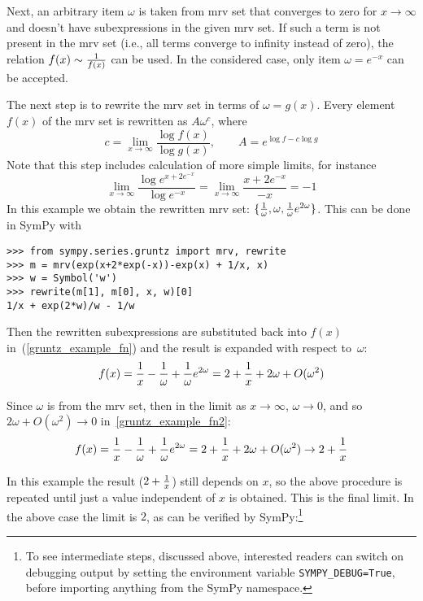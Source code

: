 Next, an arbitrary item $\omega$ is taken from mrv set that converges to zero for
$x\to\infty$ and doesn't have subexpressions in the given mrv set.  If such a term is not
present in the mrv set (i.e., all terms converge to infinity instead of zero),
the relation $f(x)\sim {1\over f(x)}$ can be used.  In the
considered case, only item $\omega=e^{-x}$ can be accepted.

The next step is to rewrite the mrv set in terms of $\omega=g(x)$.  Every element
$f(x)$ of the mrv set is rewritten as $A \omega^c$, where
\begin{equation}
\label{gruntz_rewrite}
c = \lim\limits_{x\to\infty} \frac{\log{f(x)}}{\log{g(x)}},
\qquad
A = e^{\log f - c \log g}
\end{equation}
Note that this step includes calculation of more simple limits, for instance
\begin{equation}
	\lim\limits_{x\to\infty} \frac{\log{e^{x + 2 e^{-x}}}}{\log e^{-x}}=
	\lim\limits_{x\to\infty} \frac{x + 2 e^{-x}}{-x} = -1
\end{equation}
In this example we obtain the rewritten mrv set: $\{{1\over\omega},
\omega, {1\over\omega}e^{2\omega}\}$. This can be done in SymPy with
\begin{verbatim}
>>> from sympy.series.gruntz import mrv, rewrite
>>> m = mrv(exp(x+2*exp(-x))-exp(x) + 1/x, x)
>>> w = Symbol('w')
>>> rewrite(m[1], m[0], x, w)[0]
1/x + exp(2*w)/w - 1/w
\end{verbatim}
Then the rewritten subexpressions are
substituted back into $f(x)$ in~(\ref{gruntz_example_fn})
and the result is expanded with respect to~$\omega$:
\begin{equation}
    \label{gruntz_example_fn2}
f(x) = {1\over x}-{1\over\omega}+{1\over\omega}e^{2\omega}
     = 2+{1\over x} + 2\omega + O(\omega^2)
\end{equation}

Since $\omega$ is from the mrv set, then in the limit as $x\to\infty$,
$\omega\to0$, and so $2\omega + O(\omega^2) \to 0$ in~\eqref{gruntz_example_fn2}:
\begin{equation}
f(x) = {1\over x}-{1\over\omega}+{1\over\omega}e^{2\omega}
    = 2+{1\over x} + 2\omega + O(\omega^2)
    \to 2 + {1\over x}
\end{equation}

In this example the result ($2+{1\over x}$) still depends on $x$, so the above procedure is
repeated until just a value independent of $x$ is obtained. This is the final
limit. In the above case the limit is $2$, as can be
verified by SymPy:\footnote{To see intermediate steps, discussed above, interested
readers can switch on debugging output by setting
the environment variable \texttt{SYMPY\_DEBUG=True}, before importing anything from
the SymPy namespace.}

